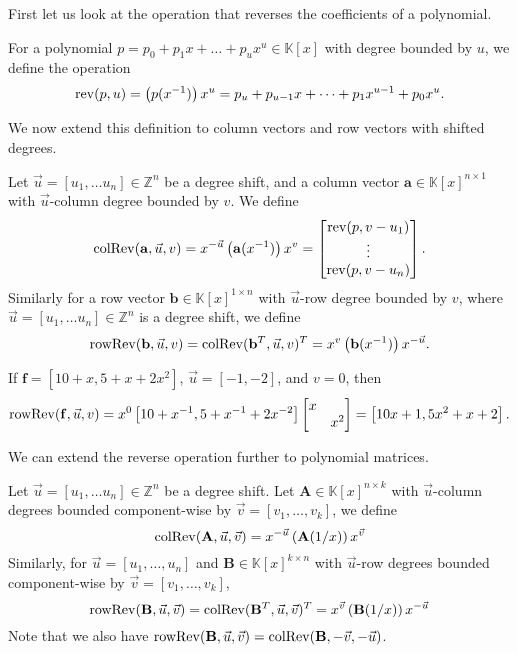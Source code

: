 First let us look at the operation that reverses the coefficients
of a polynomial.
\begin{defn}
For a polynomial $p=p_{0}+p_{1}x+\dots+p_{u}x^{u}\in\mathbb{K}\left[x\right]$
with degree bounded by $u$, we define the operation 
\[
\operatorname{rev}(p,u)=\left(p(x^{-1})\right)x^{u}=p_{u}+p_{u-1}x+\cdots+p_{1}x^{u-1}+p_{0}x^{u}.
\]

\end{defn}
We now extend this definition to column vectors and row vectors with
shifted degrees.
\begin{defn}
Let $\vec{u}=\left[u_{1},\dots u_{n}\right]\in\mathbb{Z}^{n}$ be
a degree shift, and a column vector $\mathbf{a}\in\mathbb{K}\left[x\right]^{n\times1}$
with $\vec{u}$-column degree bounded by $v$. We define
\[
\operatorname{colRev}(\mathbf{a},\vec{u},v)=x^{-\vec{u}}\left(\mathbf{a}(x^{-1})\right)x^{v}=\begin{bmatrix}\operatorname{rev}(p,v-u_{1})\\
\vdots\\
\operatorname{rev}(p,v-u_{n})
\end{bmatrix}.
\]
Similarly for a row vector $\mathbf{b}\in\mathbb{K}\left[x\right]^{1\times n}$
with $\vec{u}$-row degree bounded by $v$, where $\vec{u}=\left[u_{1},\dots u_{n}\right]\in\mathbb{Z}^{n}$
is a degree shift, we define
\[
\operatorname{rowRev}(\mathbf{b},\vec{u},v)=\operatorname{colRev}(\mathbf{b}^{T},\vec{u},v)^{T}=x^{v}\left(\mathbf{b}(x^{-1})\right)x^{-\vec{u}}.
\]
\end{defn}
\begin{example}
If $\mathbf{f}=\left[10+x,5+x+2x^{2}\right]$, $\vec{u}=\left[-1,-2\right]$,
and $v=0$, then 
\[
\operatorname{rowRev}(\mathbf{f},\vec{u},v)=x^{0}\left[10+x^{-1},5+x^{-1}+2x^{-2}\right]\begin{bmatrix}x\\
 & x^{2}
\end{bmatrix}=\left[10x+1,5x^{2}+x+2\right].
\]

\end{example}
We can extend the reverse operation further to polynomial matrices.
\begin{defn}
Let $\vec{u}=\left[u_{1},\dots u_{n}\right]\in\mathbb{Z}^{n}$ be
a degree shift. Let $\mathbf{A}\in\mathbb{K}\left[x\right]^{n\times k}$
with $\vec{u}$-column degrees bounded component-wise by $\vec{v}=\left[v_{1},\dots,v_{k}\right]$,
we define 
\[
\operatorname{colRev}(\mathbf{A},\vec{u},\vec{v})=x^{-\vec{u}}\left(\mathbf{A}(1/x)\right)x^{\vec{v}}
\]
 Similarly, for $\vec{u}=\left[u_{1},\dots,u_{n}\right]$ and $\mathbf{B}\in\mathbb{K}\left[x\right]^{k\times n}$
with $\vec{u}$-row degrees bounded component-wise by $\vec{v}=\left[v_{1},\dots,v_{k}\right]$,
\[
\operatorname{rowRev}(\mathbf{B},\vec{u},\vec{v})=\operatorname{colRev}(\mathbf{B}^{T},\vec{u},\vec{v})^{T}=x^{\vec{v}}\left(\mathbf{B}(1/x)\right)x^{-\vec{u}}
\]
 Note that we also have $\operatorname{rowRev}(\mathbf{B},\vec{u},\vec{v})=\operatorname{colRev}(\mathbf{B},-\vec{v},-\vec{u})$.
\end{defn}
